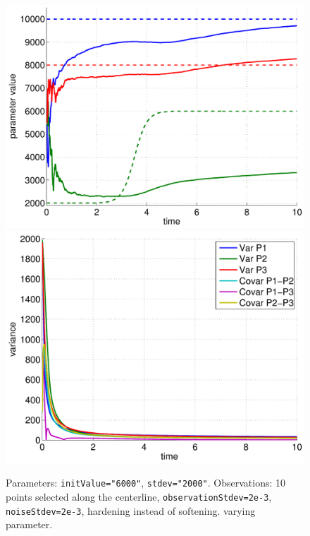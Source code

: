 \documentclass[10pt]{article}
\begin{document}
\begin{figure}[ht]
\begin{center}
\includegraphics[width=.49\linewidth]{figures/pHardSmooth3_estim.pdf}
\hfill
\includegraphics[width=.49\linewidth]{figures/pHardSmooth3_var.pdf}
\caption{Parameters: \texttt{initValue="6000"}, \texttt{stdev="2000"}. Observations: 10 points selected along the centerline,
\texttt{observationStdev=2e-3}, \texttt{noiseStdev=2e-3}, hardening instead of softening.
varying parameter.}
\label{fig:Results9}
\end{center}
\end{figure}


\end{document}
